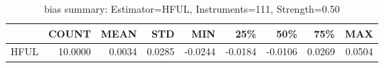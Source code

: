 \begin{table}[ht]
\centering
\caption{bias summary: Estimator=HFUL, Instruments=111, Strength=0.50}
\begin{tabular}{lrrrrrrrr}
\toprule
 & COUNT & MEAN & STD & MIN & 25\% & 50\% & 75\% & MAX \\
\midrule
HFUL & 10.0000 & 0.0034 & 0.0285 & -0.0244 & -0.0184 & -0.0106 & 0.0269 & 0.0504 \\
\bottomrule
\end{tabular}
\end{table}
